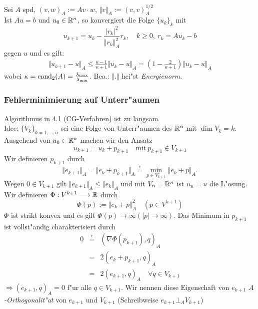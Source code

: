 \documentclass{scrartcl}
\begin{document}
\begin{Satz}
Sei $A$ spd, $(v,w)_A := Av \cdot w$, $\Vert v \Vert_A := (v,v)_A^{1/2}$ \\
Ist $Au = b$ und $u_0 \in \mathbb{R}^n$, so konvergiert die Folge $\{ u_k \}_k$ mit 
$$ u_{k+1} = u_k - \frac{ \vert r_k \vert ^2}{\Vert r_k \Vert_A^2 } r_k, \quad k \geq 0, \ r_k = Au_k - b$$
gegen $u$ und es gilt:
\begin{eqnarray*}
\Vert u_{k+1} - u \Vert_A \leq \frac{\kappa - 1}{\kappa + 1} \Vert u_k - u \Vert_A = \left( 1 - \frac{2}{\kappa + 1} \right) \Vert u_k - u \Vert_A
\end{eqnarray*}
wobei $\kappa = \mathrm{cond}_2(A) = \frac{\lambda_\mathrm{max}}{\lambda_\mathrm{min}}$. Bea.: $\Vert . \Vert$ hei"st \emph{Energienorm}.
\end{Satz}

\subsubsection{Fehlerminimierung auf Unterr"aumen}
Algorithmus in 4.1 (CG-Verfahren) ist zu langsam. \\
Idee: $\{ V_k \}_{k=1,\ldots, n}$ sei eine Folge von Unterr"aumen des $\mathbb{R}^n$ mit $\dim V_k = k$. \\
Ausgehend von $u_0 \in \mathbb{R}^n$ machen wir den Ansatz
$$u_{k+1} = u_k + p_{k+1} \quad \mathrm{mit \ } p_{k+1} \in V_{k+1}$$
Wir definieren $p_{k+1}$ durch 
$$\Vert e_{k+1} \Vert_A = \Vert e_k + p_{k+1} \Vert_A \stackrel{!}{=} \min\limits_{p \in V_{k+1}} \Vert e_k + p \Vert_A.$$
Wegen $0 \in V_{k+1}$ gilt
$\Vert e_{k+1} \Vert_A \leq \Vert e_k \Vert_A$
und mit $V_n = \mathbb{R}^n$ ist $u_n = u$ die L"osung. \\
Wir definieren $\Phi: V^{k+1} \longrightarrow \mathbb{R}$ durch
$$\Phi(p) := \Vert e_k + p \Vert_A^2 \quad (p \in V^{k+1})$$
$\Phi$ ist strikt konvex und es gilt $\Phi(p) \rightarrow \infty (\vert p \vert \rightarrow \infty)$. Das Minimum in $p_{k+1}$ ist vollst"andig charakterisiert durch
\begin{eqnarray*}
0 & \stackrel{!}{=}  & ( \nabla \Phi(p_{k+1}), q)_A \\
& = & 2 (e_k + p_{k+1}, q)_A \\
& = & 2(e_{k+1}, q)_A \quad \forall q \in V_{k+1}
\end{eqnarray*}
$\Rightarrow (e_{k+1},q)_A = 0$ f"ur alle $q \in V_{k+1}$. Wir nennen diese Eigenschaft von $e_{k+1}$ \emph{$A$-Orthogonalit"at} von $e_{k+1}$ und $V_{k+1}$ (Schreibweise $e_{k+1} \bot_A V_{k+1}$)
\end{document}

